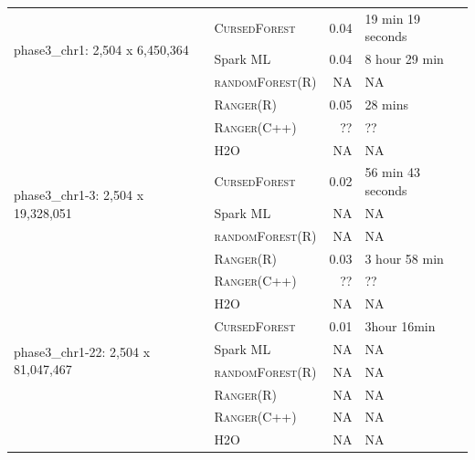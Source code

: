 \documentclass[10pt,letterpaper]{article}
\newcommand{\cursedforest}{\textsc{CursedForest}\xspace}
\newcommand{\ranger}{\textsc{Ranger}\xspace}
\newcommand{\randomforest}{\textsc{randomForest}\xspace}
\begin{document}
\begin{table}[!ht]
\begin{minipage}{\textwidth}
\begin{tabular}{| l | l | r | l |}
\multirow{3}{*}{phase3\_chr1: 2,504 x 6,450,364}    & \cursedforest & 0.04  & 19 min 19 seconds         \\ %
                                                    & Spark ML  & 0.04       & 8 hour 29 min        \\ %
                                                    & \randomforest (R)        & NA         & NA                \\
                                                    & \ranger (R)      &  0.05       & 28 mins         \\ %
                                                    & \ranger (C++)     & ??       & ??            \\
                                                    & H2O           & NA       & NA         \\
\hline

\multirow{3}{*}{phase3\_chr1-3: 2,504 x 19,328,051} & \cursedforest & 0.02  & 56 min 43 seconds             \\ %
                                                    & Spark ML &    NA         &   NA               \\ %
                                                    & \randomforest (R)        & NA         & NA                \\
                                                    & \ranger (R)      & 0.03      &    3 hour 58 min     \\ %
                                                    & \ranger (C++)     & ??       & ??            \\
                                                    & H2O           & NA       & NA         \\
\hline

\multirow{4}{*}{phase3\_chr1-22: 2,504 x 81,047,467} & \cursedforest & 0.01  & 3hour 16min \\ %
                                                    & Spark ML & NA & NA  \\
                                                    & \randomforest (R)        & NA         & NA                \\
                                                    & \ranger (R)       &        NA     &        NA    \\
                                                    & \ranger (C++)       &        NA     &        NA    \\
                                                    & H2O           & NA       & NA         \\
\hline





\end{tabular}
\end{minipage}
\end{table}
\end{document}
